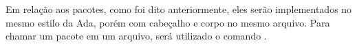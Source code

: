 Em relação aos pacotes, como foi dito anteriormente, eles serão implementados
no mesmo estilo da Ada, porém com cabeçalho e corpo no mesmo arquivo. Para
chamar um pacote em um arquivo, será utilizado o comando .

